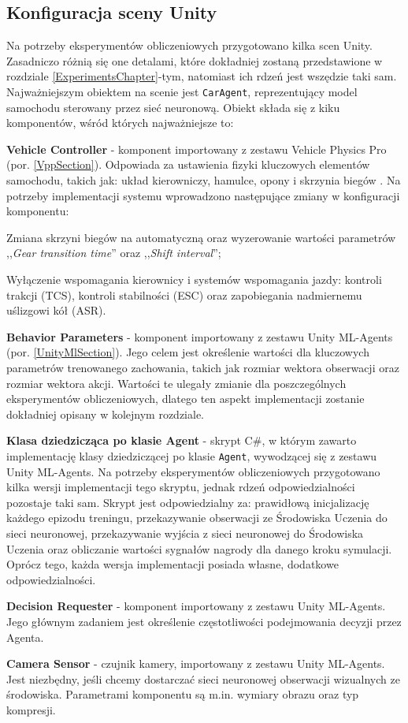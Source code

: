 \subsection{Konfiguracja sceny Unity}
Na potrzeby eksperymentów obliczeniowych przygotowano kilka scen Unity. Zasadniczo różnią się one detalami, które dokładniej zostaną przedstawione w rozdziale \ref{ExperimentsChapter}-tym, natomiast ich rdzeń jest wszędzie taki sam. Najważniejszym obiektem na scenie jest \texttt{CarAgent}, reprezentujący model samochodu sterowany przez sieć neuronową. Obiekt składa się z kiku komponentów, wśród których najważniejsze to:
\begin{enumerate*}
\item \textbf{Vehicle Controller} - komponent importowany z zestawu Vehicle Physics Pro (por. \ref{VppSection}). Odpowiada za ustawienia fizyki kluczowych elementów samochodu, takich jak: układ kierowniczy, hamulce, opony i skrzynia biegów \cite{vpp:vehicleController}. Na potrzeby implementacji systemu wprowadzono następujące zmiany w konfiguracji komponentu:
\begin{itemize*}
\item Zmiana skrzyni biegów na automatyczną oraz wyzerowanie wartości parametrów ,,\textit{Gear transition time}'' oraz ,,\textit{Shift interval}'';
\item Wyłączenie wspomagania kierownicy i systemów wspomagania jazdy: kontroli trakcji (TCS), kontroli stabilności (ESC) oraz zapobiegania nadmiernemu uślizgowi kół (ASR).
\end{itemize*}
\item \textbf{Behavior Parameters} - komponent importowany z zestawu Unity ML-Agents (por. \ref{UnityMlSection}). Jego celem jest określenie wartości dla kluczowych parametrów trenowanego zachowania, takich jak rozmiar wektora obserwacji oraz rozmiar wektora akcji. Wartości te ulegały zmianie dla poszczególnych eksperymentów obliczeniowych, dlatego ten aspekt implementacji zostanie dokładniej opisany w kolejnym rozdziale.
\item \textbf{Klasa dziedzicząca po klasie Agent} - skrypt C\#, w którym zawarto implementację klasy dziedziczącej po klasie \texttt{Agent}, wywodzącej się z zestawu Unity ML-Agents. Na potrzeby eksperymentów obliczeniowych przygotowano kilka wersji implementacji tego skryptu, jednak rdzeń odpowiedzialności pozostaje taki sam. Skrypt jest odpowiedzialny za: prawidłową inicjalizację każdego epizodu treningu, przekazywanie obserwacji ze Środowiska Uczenia do sieci neuronowej, przekazywanie wyjścia z sieci neuronowej do Środowiska Uczenia oraz obliczanie wartości sygnałów nagrody dla danego kroku symulacji. Oprócz tego, każda wersja implementacji posiada własne, dodatkowe odpowiedzialności.
\item \textbf{Decision Requester} - komponent importowany z zestawu Unity ML-Agents. Jego głównym zadaniem jest określenie częstotliwości podejmowania decyzji przez Agenta.
\item \textbf{Camera Sensor} - czujnik kamery, importowany z zestawu Unity ML-Agents. Jest niezbędny, jeśli chcemy dostarczać sieci neuronowej obserwacji wizualnych ze środowiska. Parametrami komponentu są m.in. wymiary obrazu oraz typ kompresji.
\end{enumerate*}

